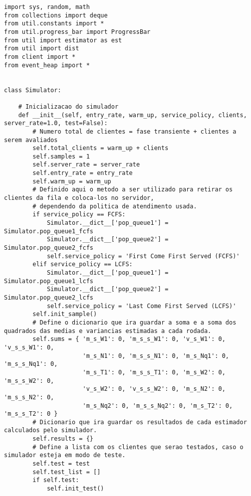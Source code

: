\begin{lstlisting}
import sys, random, math
from collections import deque
from util.constants import *
from util.progress_bar import ProgressBar
from util import estimator as est
from util import dist
from client import *
from event_heap import *


class Simulator:

    # Inicializacao do simulador
    def __init__(self, entry_rate, warm_up, service_policy, clients, server_rate=1.0, test=False):
        # Numero total de clientes = fase transiente + clientes a serem avaliados 
        self.total_clients = warm_up + clients
        self.samples = 1
        self.server_rate = server_rate
        self.entry_rate = entry_rate
        self.warm_up = warm_up
        # Definido aqui o metodo a ser utilizado para retirar os clientes da fila e coloca-los no servidor,
        # dependendo da politica de atendimento usada.
        if service_policy == FCFS:
            Simulator.__dict__['pop_queue1'] = Simulator.pop_queue1_fcfs
            Simulator.__dict__['pop_queue2'] = Simulator.pop_queue2_fcfs
            self.service_policy = 'First Come First Served (FCFS)'
        elif service_policy == LCFS:
            Simulator.__dict__['pop_queue1'] = Simulator.pop_queue1_lcfs
            Simulator.__dict__['pop_queue2'] = Simulator.pop_queue2_lcfs
            self.service_policy = 'Last Come First Served (LCFS)'
        self.init_sample()
        # Define o dicionario que ira guardar a soma e a soma dos quadrados das medias e variancias estimadas a cada rodada.
        self.sums = { 'm_s_W1': 0, 'm_s_s_W1': 0, 'v_s_W1': 0, 'v_s_s_W1': 0,            
                      'm_s_N1': 0, 'm_s_s_N1': 0, 'm_s_Nq1': 0, 'm_s_s_Nq1': 0,            
                      'm_s_T1': 0, 'm_s_s_T1': 0, 'm_s_W2': 0, 'm_s_s_W2': 0,            
                      'v_s_W2': 0, 'v_s_s_W2': 0, 'm_s_N2': 0, 'm_s_s_N2': 0,
                      'm_s_Nq2': 0, 'm_s_s_Nq2': 0, 'm_s_T2': 0, 'm_s_s_T2': 0 }
        # Dicionario que ira guardar os resultados de cada estimador calculados pelo simulador.
        self.results = {}
        # Define a lista com os clientes que serao testados, caso o simulador esteja em modo de teste.
        self.test = test
        self.test_list = []
        if self.test:
            self.init_test()
    

\end{lstlisting}
